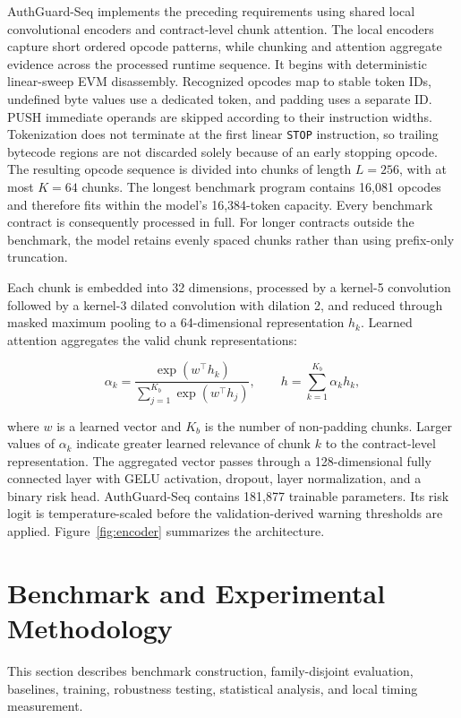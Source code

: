 \documentclass[conference]{IEEEtran}
\newcommand{\code}[1]{\texttt{#1}}
\begin{document}
AuthGuard-Seq implements the preceding requirements using shared local convolutional encoders and contract-level chunk attention. The local encoders capture short ordered opcode patterns, while chunking and attention aggregate evidence across the processed runtime sequence. It begins with deterministic linear-sweep EVM disassembly. Recognized opcodes map to stable token IDs, undefined byte values use a dedicated token, and padding uses a separate ID. PUSH immediate operands are skipped according to their instruction widths. Tokenization does not terminate at the first linear \code{STOP} instruction, so trailing bytecode regions are not discarded solely because of an early stopping opcode. The resulting opcode sequence is divided into chunks of length $L=256$, with at most $K=64$ chunks. The longest benchmark program contains 16,081 opcodes and therefore fits within the model's 16,384-token capacity. Every benchmark contract is consequently processed in full. For longer contracts outside the benchmark, the model retains evenly spaced chunks rather than using prefix-only truncation.

Each chunk is embedded into 32 dimensions, processed by a kernel-5 convolution followed by a kernel-3 dilated convolution with dilation 2, and reduced through masked maximum pooling to a 64-dimensional representation $h_k$. Learned attention aggregates the valid chunk representations:

\begin{equation}
\alpha_k=\frac{\exp(w^\top h_k)}{\sum_{j=1}^{K_b}\exp(w^\top h_j)},
\qquad
h=\sum_{k=1}^{K_b}\alpha_k h_k,
\label{eq:attention}
\end{equation}


where $w$ is a learned vector and $K_b$ is the number of non-padding chunks. Larger values of $\alpha_k$ indicate greater learned relevance of chunk $k$ to the contract-level representation. The aggregated vector passes through a 128-dimensional fully connected layer with GELU activation, dropout, layer normalization, and a binary risk head. AuthGuard-Seq contains 181,877 trainable parameters. Its risk logit is temperature-scaled before the validation-derived warning thresholds are applied. Figure~\ref{fig:encoder} summarizes the architecture.




\section{Benchmark and Experimental Methodology}
\label{sec:method}
This section describes benchmark construction, family-disjoint evaluation, baselines, training, robustness testing, statistical analysis, and local timing measurement.
\end{document}
